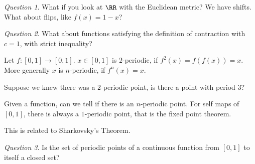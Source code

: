 \documentclass{article}
\theoremstyle{remark}
\newtheorem*{question}{Question}
\begin{document}
\begin{question}
    What if you look at $\RR$ with the Euclidean metric?
    We have shifts. What about flips, like $f(x)=1-x$?
\end{question}

\begin{question}
    What about functions satisfying the definition of contraction
    with $c=1$, with strict inequality?
\end{question}

\begin{definition}
    Let $f:[0,1]\to[0,1]$. $x\in [0,1]$ is $2$-periodic, if 
    $f^2(x) = f(f(x))=x$. More generally $x$ is $n$-periodic,
    if $f^n(x)=x$.
\end{definition}

Suppose we knew there was a $2$-periodic point, is there a point
with period $3$?

Given a function, can we tell if there is an $n$-periodic point.
For self maps of $[0,1]$, there is always a $1$-periodic point,
that is the fixed point theorem. 

This is related to Sharkovsky's Theorem.

\begin{question}
    Is the set of periodic points of a continuous function
    from $[0,1]$ to itself a closed set?
\end{question}
\end{document}
